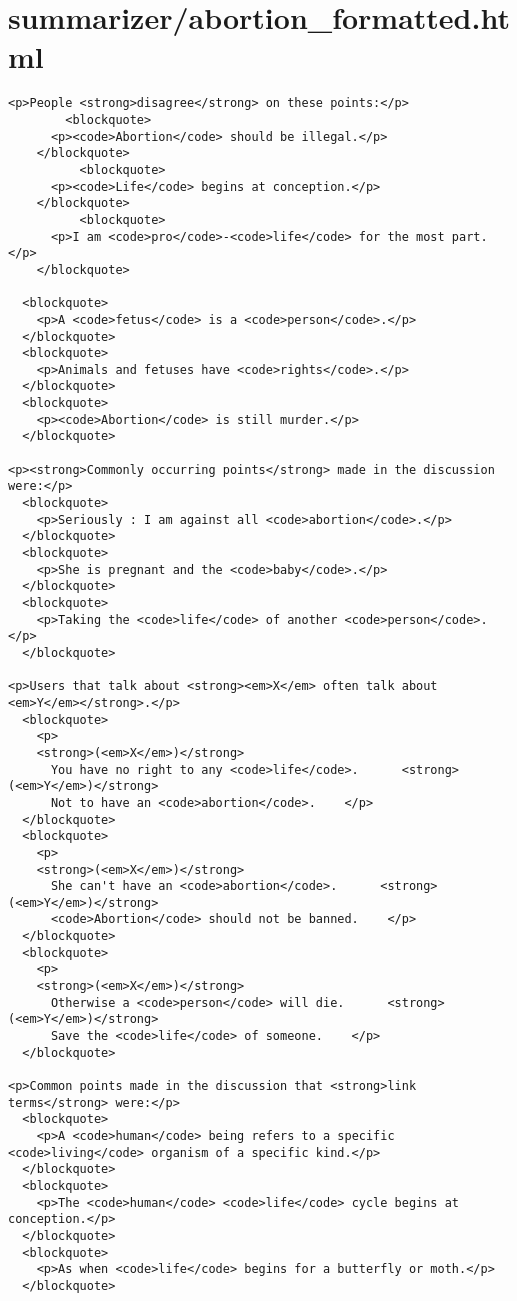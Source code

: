 \documentclass{article}
\begin{document}
\section*{summarizer/abortion\_formatted.html}
\begin{verbatim}
<p>People <strong>disagree</strong> on these points:</p>
        <blockquote>
      <p><code>Abortion</code> should be illegal.</p>
    </blockquote>
          <blockquote>
      <p><code>Life</code> begins at conception.</p>
    </blockquote>
          <blockquote>
      <p>I am <code>pro</code>-<code>life</code> for the most part.</p>
    </blockquote>
  
  <blockquote>
    <p>A <code>fetus</code> is a <code>person</code>.</p>
  </blockquote>
  <blockquote>
    <p>Animals and fetuses have <code>rights</code>.</p>
  </blockquote>
  <blockquote>
    <p><code>Abortion</code> is still murder.</p>
  </blockquote>

<p><strong>Commonly occurring points</strong> made in the discussion were:</p>
  <blockquote>
    <p>Seriously : I am against all <code>abortion</code>.</p>
  </blockquote>
  <blockquote>
    <p>She is pregnant and the <code>baby</code>.</p>
  </blockquote>
  <blockquote>
    <p>Taking the <code>life</code> of another <code>person</code>.</p>
  </blockquote>

<p>Users that talk about <strong><em>X</em> often talk about <em>Y</em></strong>.</p>
  <blockquote>
    <p>
    <strong>(<em>X</em>)</strong>
      You have no right to any <code>life</code>.      <strong>(<em>Y</em>)</strong>
      Not to have an <code>abortion</code>.    </p>
  </blockquote>
  <blockquote>
    <p>
    <strong>(<em>X</em>)</strong>
      She can't have an <code>abortion</code>.      <strong>(<em>Y</em>)</strong>
      <code>Abortion</code> should not be banned.    </p>
  </blockquote>
  <blockquote>
    <p>
    <strong>(<em>X</em>)</strong>
      Otherwise a <code>person</code> will die.      <strong>(<em>Y</em>)</strong>
      Save the <code>life</code> of someone.    </p>
  </blockquote>

<p>Common points made in the discussion that <strong>link terms</strong> were:</p>
  <blockquote>
    <p>A <code>human</code> being refers to a specific <code>living</code> organism of a specific kind.</p>
  </blockquote>
  <blockquote>
    <p>The <code>human</code> <code>life</code> cycle begins at conception.</p>
  </blockquote>
  <blockquote>
    <p>As when <code>life</code> begins for a butterfly or moth.</p>
  </blockquote>


\end{verbatim}
\end{document}

